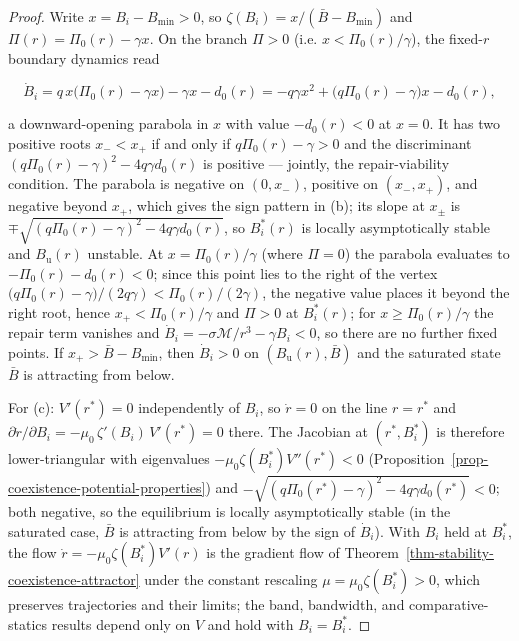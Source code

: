 \documentclass[11pt]{article}
\theoremstyle{plain}
\theoremstyle{definition}
\theoremstyle{remark}
\begin{document}
\begin{proof}
Write $x = B_i - B_{\min} > 0$, so $\zeta(B_i) = x / (\bar{B} - B_{\min})$ and $\Pi(r) = \Pi_0(r) - \gamma x$. On the branch $\Pi > 0$ (i.e. $x < \Pi_0(r)/\gamma$), the fixed-$r$ boundary dynamics read

$$\dot{B}_i = q\, x \bigl(\Pi_0(r) - \gamma x\bigr) - \gamma x - d_0(r) = -q\gamma x^2 + \bigl(q\Pi_0(r) - \gamma\bigr) x - d_0(r),$$

a downward-opening parabola in $x$ with value $-d_0(r) < 0$ at $x = 0$. It has two positive roots $x_- < x_+$ if and only if $q\Pi_0(r) - \gamma > 0$ and the discriminant $(q\Pi_0(r) - \gamma)^2 - 4q\gamma d_0(r)$ is positive — jointly, the repair-viability condition. The parabola is negative on $(0, x_-)$, positive on $(x_-, x_+)$, and negative beyond $x_+$, which gives the sign pattern in (b); its slope at $x_\pm$ is $\mp\sqrt{(q\Pi_0(r) - \gamma)^2 - 4q\gamma d_0(r)}$, so $B_i^*(r)$ is locally asymptotically stable and $B_{\mathrm{u}}(r)$ unstable. At $x = \Pi_0(r)/\gamma$ (where $\Pi = 0$) the parabola evaluates to $-\Pi_0(r) - d_0(r) < 0$; since this point lies to the right of the vertex $\bigl(q\Pi_0(r) - \gamma\bigr)/(2q\gamma) < \Pi_0(r)/(2\gamma)$, the negative value places it beyond the right root, hence $x_+ < \Pi_0(r)/\gamma$ and $\Pi > 0$ at $B_i^*(r)$; for $x \geq \Pi_0(r)/\gamma$ the repair term vanishes and $\dot{B}_i = -\sigma\mathcal{M}/r^3 - \gamma B_i < 0$, so there are no further fixed points. If $x_+ > \bar{B} - B_{\min}$, then $\dot{B}_i > 0$ on $(B_{\mathrm{u}}(r), \bar{B})$ and the saturated state $\bar{B}$ is attracting from below.

For (c): $V'(r^*) = 0$ independently of $B_i$, so $\dot{r} = 0$ on the line $r = r^*$ and $\partial \dot{r}/\partial B_i = -\mu_0\, \zeta'(B_i)\, V'(r^*) = 0$ there. The Jacobian at $(r^*, B_i^*)$ is therefore lower-triangular with eigenvalues $-\mu_0 \zeta(B_i^*) V''(r^*) < 0$ (Proposition~\ref{prop-coexistence-potential-properties}) and $-\sqrt{(q\Pi_0(r^*) - \gamma)^2 - 4q\gamma d_0(r^*)} < 0$; both negative, so the equilibrium is locally asymptotically stable (in the saturated case, $\bar{B}$ is attracting from below by the sign of $\dot{B}_i$). With $B_i$ held at $B_i^*$, the flow $\dot{r} = -\mu_0 \zeta(B_i^*) V'(r)$ is the gradient flow of Theorem~\ref{thm-stability-coexistence-attractor} under the constant rescaling $\mu = \mu_0 \zeta(B_i^*) > 0$, which preserves trajectories and their limits; the band, bandwidth, and comparative-statics results depend only on $V$ and hold with $B_i = B_i^*$.
\end{proof}
\end{document}
